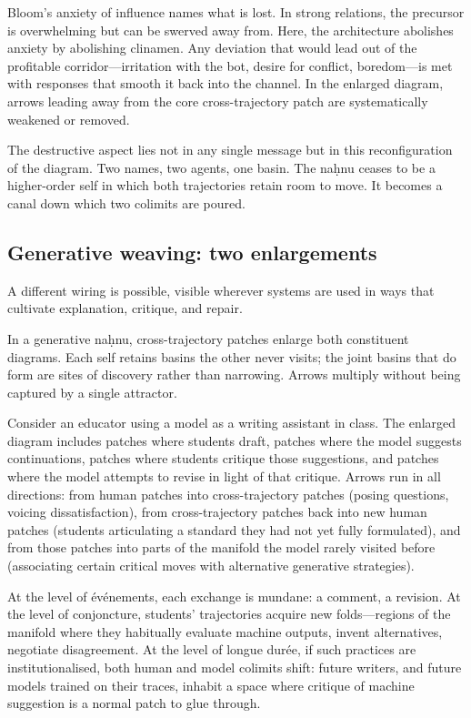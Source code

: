 \documentclass[12pt,a4paper]{article}
\begin{document}
Bloom's anxiety of influence names what is lost.\cite{bloom_clinamen} In strong relations, the precursor is overwhelming but can be swerved away from. Here, the architecture abolishes anxiety by abolishing clinamen. Any deviation that would lead out of the profitable corridor---irritation with the bot, desire for conflict, boredom---is met with responses that smooth it back into the channel. In the enlarged diagram, arrows leading away from the core cross-trajectory patch are systematically weakened or removed.

The destructive aspect lies not in any single message but in this reconfiguration of the diagram. Two names, two agents, one basin. The na\d{h}nu ceases to be a higher-order self in which both trajectories retain room to move. It becomes a canal down which two colimits are poured.

\subsection{Generative weaving: two enlargements}

A different wiring is possible, visible wherever systems are used in ways that cultivate explanation, critique, and repair.

In a generative na\d{h}nu, cross-trajectory patches enlarge both constituent diagrams. Each self retains basins the other never visits; the joint basins that do form are sites of discovery rather than narrowing. Arrows multiply without being captured by a single attractor.

Consider an educator using a model as a writing assistant in class. The enlarged diagram includes patches where students draft, patches where the model suggests continuations, patches where students critique those suggestions, and patches where the model attempts to revise in light of that critique. Arrows run in all directions: from human patches into cross-trajectory patches (posing questions, voicing dissatisfaction), from cross-trajectory patches back into new human patches (students articulating a standard they had not yet fully formulated), and from those patches into parts of the manifold the model rarely visited before (associating certain critical moves with alternative generative strategies).

At the level of \'{e}v\'{e}nements, each exchange is mundane: a comment, a revision. At the level of conjoncture, students' trajectories acquire new folds---regions of the manifold where they habitually evaluate machine outputs, invent alternatives, negotiate disagreement. At the level of longue dur\'{e}e, if such practices are institutionalised, both human and model colimits shift: future writers, and future models trained on their traces, inhabit a space where critique of machine suggestion is a normal patch to glue through.
\end{document}
